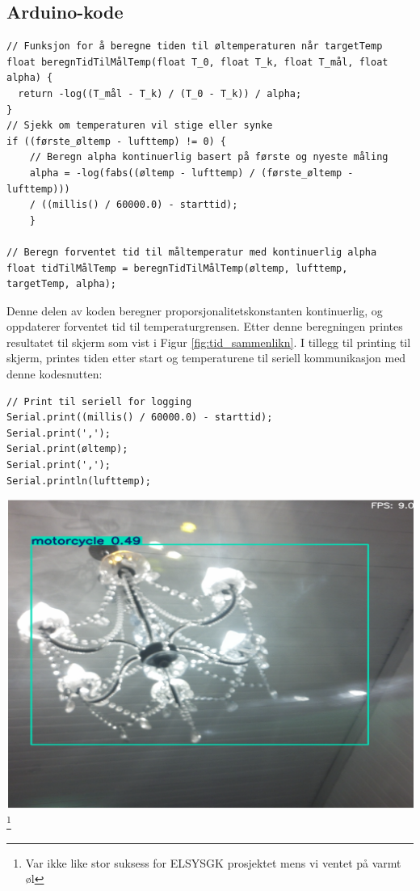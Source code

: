 \documentclass{article}
\begin{document}
\subsection{Arduino-kode}
\begin{verbatim}
// Funksjon for å beregne tiden til øltemperaturen når targetTemp
float beregnTidTilMålTemp(float T_0, float T_k, float T_mål, float alpha) {
  return -log((T_mål - T_k) / (T_0 - T_k)) / alpha;
}
// Sjekk om temperaturen vil stige eller synke
if ((første_øltemp - lufttemp) != 0) {
    // Beregn alpha kontinuerlig basert på første og nyeste måling
    alpha = -log(fabs((øltemp - lufttemp) / (første_øltemp - lufttemp))) 
    / ((millis() / 60000.0) - starttid);
    }

// Beregn forventet tid til måltemperatur med kontinuerlig alpha
float tidTilMålTemp = beregnTidTilMålTemp(øltemp, lufttemp, targetTemp, alpha);

\end{verbatim}
Denne delen av koden beregner proporsjonalitetskonstanten kontinuerlig, og oppdaterer forventet tid til temperaturgrensen. Etter denne beregningen printes resultatet til skjerm som vist i Figur \ref{fig:tid_sammenlikn}.
I tillegg til printing til skjerm, printes tiden etter start og temperaturene til seriell kommunikasjon med denne kodesnutten:
\begin{verbatim}
// Print til seriell for logging
Serial.print((millis() / 60000.0) - starttid);
Serial.print(',');
Serial.print(øltemp);
Serial.print(',');
Serial.println(lufttemp);
\end{verbatim}
\begin{center}
    \includegraphics[width=0.8\linewidth]{motorcycle.png}\footnote{Var ikke like stor suksess for ELSYSGK prosjektet mens vi ventet på varmt øl}
\end{center}
\vfill
\end{document}
